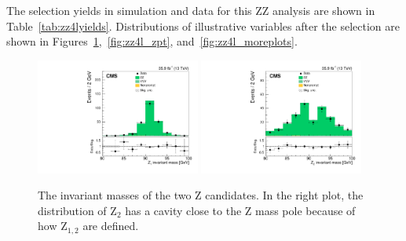 The selection yields in simulation and data for this ZZ analysis are shown in Table~\ref{tab:zz4lyields}.
Distributions of illustrative variables after the selection are shown in Figures~\ref{fig:zz4l_mll},~\ref{fig:zz4l_zpt}, and~\ref{fig:zz4l_moreplots}.

\begin{figure}[!hb]
\centering
\includegraphics[width=0.48\textwidth]{figures/dibosons/zz4l/mZ1.pdf}
\includegraphics[width=0.48\textwidth]{figures/dibosons/zz4l/mZ2.pdf}
\caption{The invariant masses of the two Z candidates. 
In the right plot, the distribution of $\mathrm{Z}_{2}$ has a cavity close to the Z mass pole because of how $\mathrm{Z}_{1,2}$ are defined.
\label{fig:zz4l_mll}}
\end{figure}

